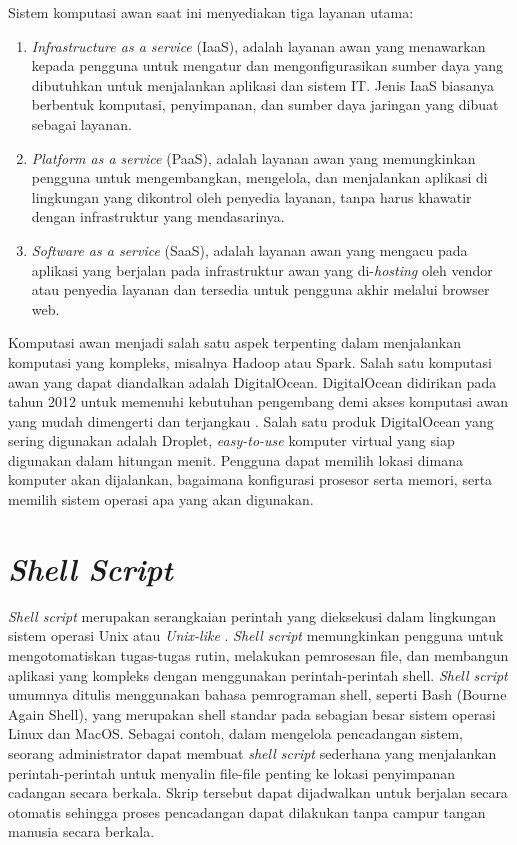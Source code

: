 Sistem komputasi awan saat ini menyediakan tiga layanan utama:
\begin{enumerate}
	\item \textit{Infrastructure as a service} (IaaS), adalah layanan awan yang menawarkan kepada pengguna untuk mengatur dan mengonfigurasikan sumber daya yang dibutuhkan untuk menjalankan aplikasi dan sistem IT. Jenis IaaS biasanya berbentuk komputasi, penyimpanan, dan sumber daya jaringan yang dibuat sebagai layanan.
	\item \textit{Platform as a service} (PaaS), adalah layanan awan yang memungkinkan pengguna untuk mengembangkan, mengelola, dan menjalankan aplikasi di lingkungan yang dikontrol oleh penyedia layanan, tanpa harus khawatir dengan infrastruktur yang mendasarinya. 
	\item \textit{Software as a service} (SaaS), adalah layanan awan yang mengacu pada aplikasi yang berjalan pada infrastruktur awan yang di-\textit{hosting} oleh vendor atau penyedia layanan dan tersedia untuk pengguna akhir melalui browser web. 
\end{enumerate}
Komputasi awan menjadi salah satu aspek terpenting dalam menjalankan komputasi yang kompleks, misalnya Hadoop atau Spark. Salah satu komputasi awan yang dapat diandalkan adalah DigitalOcean. DigitalOcean didirikan pada tahun 2012 untuk memenuhi kebutuhan pengembang demi akses komputasi awan yang mudah dimengerti dan terjangkau \cite{DigitalOcean}. Salah satu produk DigitalOcean yang sering digunakan adalah Droplet, \textit{easy-to-use} komputer virtual yang siap digunakan dalam hitungan menit. Pengguna dapat memilih lokasi dimana komputer akan dijalankan, bagaimana konfigurasi prosesor serta memori, serta memilih sistem operasi apa yang akan digunakan.

\section{\textit{Shell Script}}
\textit{Shell script} merupakan serangkaian perintah yang dieksekusi dalam lingkungan sistem operasi Unix atau \textit{Unix-like} \cite{newhamLearningBashShell2005}. \textit{Shell script} memungkinkan pengguna untuk mengotomatiskan tugas-tugas rutin, melakukan pemrosesan file, dan membangun aplikasi yang kompleks dengan menggunakan perintah-perintah shell. \textit{Shell script} umumnya ditulis menggunakan bahasa pemrograman shell, seperti Bash (Bourne Again Shell), yang merupakan shell standar pada sebagian besar sistem operasi Linux dan MacOS.
Sebagai contoh, dalam mengelola pencadangan sistem, seorang administrator dapat membuat \textit{shell script} sederhana yang menjalankan perintah-perintah untuk menyalin file-file penting ke lokasi penyimpanan cadangan secara berkala. Skrip tersebut dapat dijadwalkan untuk berjalan secara otomatis sehingga proses pencadangan dapat dilakukan tanpa campur tangan manusia secara berkala. 


